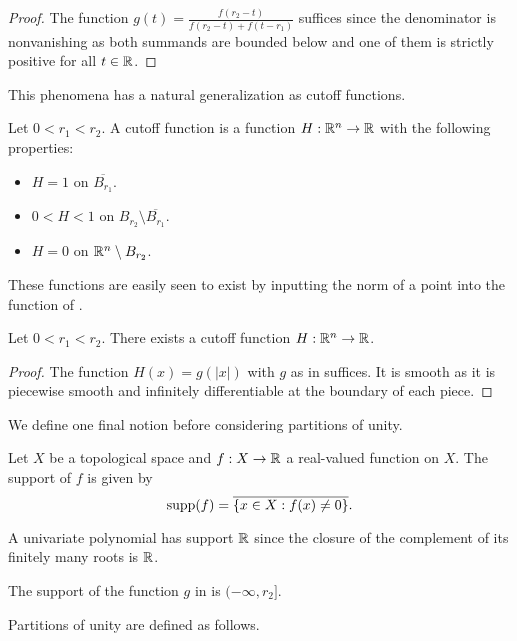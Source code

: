 \begin{proof}
    The function $g(t)=\frac{f(r_{2}-t)}{f(r_{2}-t)+f(t-r_{1})}$ suffices since the denominator is nonvanishing as both summands are bounded below and one of them is strictly positive for all $t\in\mathbb{R}$. 
\end{proof}
This phenomena has a natural generalization as cutoff functions. 
\begin{definition}\label{def: cutoff functions}
    Let $0<r_{1}<r_{2}$. A cutoff function is a function $H:\mathbb{R}^{n}\to\mathbb{R}$ with the following properties:
    \begin{itemize}
        \item $H=1$ on $\overline{B_{r_{1}}}$. 
        \item $0<H<1$ on $B_{r_{2}}\setminus\overline{B_{r_{1}}}$. 
        \item $H=0$ on $\mathbb{R}^{n}\setminus B_{r_{2}}$. 
    \end{itemize}
\end{definition}
These functions are easily seen to exist by inputting the norm of a point into the function of . 
\begin{lemma}\label{lem: existence of cutoff functions}
    Let $0<r_{1}<r_{2}$. There exists a cutoff function $H:\mathbb{R}^{n}\to\mathbb{R}$. 
\end{lemma}
\begin{proof}
    The function $H(x)=g(|x|)$ with $g$ as in  suffices. It is smooth as it is piecewise smooth and infinitely differentiable at the boundary of each piece. 
\end{proof}
We define one final notion before considering partitions of unity. 
\begin{definition}[Support]\label{def: support}
    Let $X$ be a topological space and $f:X\to\mathbb{R}$ a real-valued function on $X$. The support of $f$ is given by 
    $$\mathrm{supp}(f)=\overline{\{x\in X:f(x)\neq 0\}}.$$
\end{definition}
\begin{example}
    A univariate polynomial has support $\mathbb{R}$ since the closure of the complement of its finitely many roots is $\mathbb{R}$. 
\end{example}
\begin{example}
    The support of the function $g$ in  is $(-\infty,r_{2}]$. 
\end{example}
Partitions of unity are defined as follows. 
